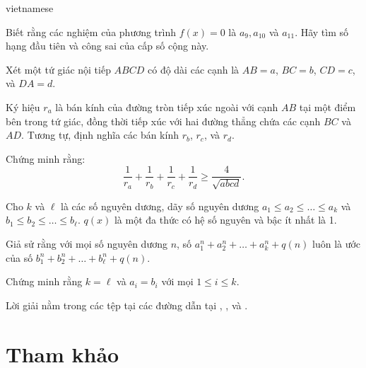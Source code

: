 \documentclass{article}
\begin{document}
\begin{otherlanguage*}{vietnamese}
\begin{problem*}
    Biết rằng các nghiệm của phương trình \( f(x) = 0 \) là \( a_9, a_{10} \) và \( a_{11} \). Hãy tìm số hạng đầu tiên và công sai của cấp số cộng này.
\end{problem*}

\begin{problem*}
    Xét một tứ giác nội tiếp \( ABCD \) có độ dài các cạnh là \( AB = a \), \( BC = b \), \( CD = c \), và \( DA = d \).  
    
    Ký hiệu \( r_a \) là bán kính của đường tròn tiếp xúc ngoài với cạnh \( AB \) tại một điểm bên trong tứ giác,
    đồng thời tiếp xúc với hai đường thẳng chứa các cạnh \( BC \) và \( AD \). Tương tự, định nghĩa các bán kính \( r_b \), \( r_c \), và \( r_d \).  
    
    Chứng minh rằng:
    \[
        \frac{1}{r_a} + \frac{1}{r_b} + \frac{1}{r_c} + \frac{1}{r_d} \geq \frac{4}{\sqrt{abcd}}.
    \]
\end{problem*}

\begin{problem*}
    Cho \( k \) và \( \ell \) là các số nguyên dương, dãy số nguyên dương \( a_1 \leq a_2 \leq \dots \leq a_k \) và \( b_1 \leq b_2 \leq \dots \leq b_\ell \).
    \( q(x) \) là một đa thức có hệ số nguyên và bậc ít nhất là 1.  
    
    Giả sử rằng với mọi số nguyên dương \( n \), số $a_1^n + a_2^n + \dots + a_k^n + q(n)$ luôn là ước của số $b_1^n + b_2^n + \dots + b_\ell^n + q(n).$
    
    Chứng minh rằng \( k = \ell \) và \( a_i = b_i \) với mọi \( 1 \leq i \leq k \).
\end{problem*}

\begin{remark*}
    Lời giải nằm trong các tệp tại các đường dẫn tại \cite{mat1_javut_d}, \cite{mat2_javut_d}, và \cite{mat3_javut_d}.
\end{remark*}

\newpage

\section*{Tham khảo}


\end{otherlanguage*}
\end{document}
